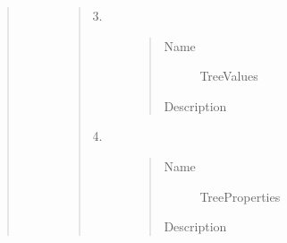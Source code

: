 \documentclass[letterpaper,10pt,english]{sphinxmanual}
\begin{document}
\begin{quote}
\begin{description}
\begin{quote}
\begin{description}
\begin{quote}
\begin{description}
\end{description}\end{quote}

\item[{3.}] \leavevmode\begin{quote}\begin{description}
\item[{Name}] \leavevmode
TreeValues

\item[{Description}] \leavevmode
{}

\end{description}\end{quote}

\item[{4.}] \leavevmode\begin{quote}\begin{description}
\item[{Name}] \leavevmode
TreeProperties

\item[{Description}] \leavevmode
{}

\end{description}\end{quote}

\end{description}\end{quote}

\end{description}\end{quote}
\end{document}
